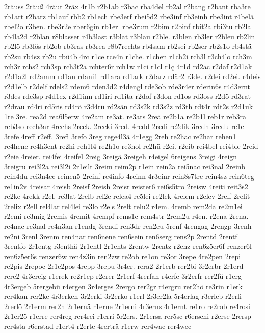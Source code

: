 {2räuss
2räuß
4räut
2räx
4r1b
r2b1ab
r3bac
rba4del
rb2al
r2bang
r2bant
rba3re
rb1art
r2barz
rb1auf
rbb2
rb1ech
rbe3erf
rbei5d2
rbe3inf
rb3einh
rbe3int
r4belä
rbel2o
r3ben.
rbe3r2e
rber6gin
rb1erl
rbe3rum
r2bim
r2binf
rbit2a
rbi3tu
rb2la
rb4la2d
r2blan
r8blasser
r4b3last
r3blat
r3blau
r2ble.
r3blen
rb3ler
r2bleu
rb2lin
rb2lö
rb3lös
rb2ob
rb3ras
rb3rea
r8b7rechts
rb4sam
rb2sei
rb2ser
rb2s1o
rb4stä
rb2su
rb4sz
rb2u
rbü4b
4rc
r1ce
rce4n
r1che.
r1chen
r1ch2i
rch3l
r3ch4lo
rch3m
rch3r
rchs2
rch3sp
rch3t2a
rchter6r
rch1w
r1ci
r1cl
r1ç
4r1d
rd2ac
r2daf
r2d1ak
r2d1a2l
rd2amm
rd1an
rdani1
rd1ara
rd1ark
r2darz
rdär2
r3de.
r2dei
rd2ei.
r4deis
r2d1elb
r2delf
rdels2
rdem6
rden3d2
r4dengl
rde3ob
rde3r4er
rderin6s
r4d3ernt
r3des
rde3sp
r4d1ex
r2d1inn
rd1iri
rd1ita
r2dof
r3don
rd1os
rd3oss
r2dö
rd3rat
r2drau
rd4ri
rd5ris
rd4rö
r3d4rü
rd2sän
rd3s2k
rd3s2z
rd3th
rdt4r
rdt2s
r2d1uk
1re
3re.
rea2d
rea6l5erw
4re2am
re3at.
re3ats
2reä
re2b1a
re2b1l
reb1r
reb3ra
reb3so
rech3ar
4rechs
2reck.
2recki
3red.
4redd
2redi
re2dik
3redn
3redu
re1e
3refe
4reff
r2eff.
3refl
3refo
3reg
rege4l3ä
4r1egg
2reh
re2hac
re2har
rehen1
re4hene
re4h3ent
re2hi
reh1l4
re2h1o
re3hol
re2hü
r2ei.
r2eib
rei4bel
rei4ble
2reid
r2eie
4reier.
rei4fei
4reifel
2reig
3reigä
3reigeh
r4eigel
6reigens
3reigi
4reign
3reigru
rei3l2a
rei3l2i
2r1eilt
3reim
reim2p
r1ein
rein2a
rei5nac
rei3nal
2reinb
rein4du
rei3n4ec
reinen5
2reinf
re4info
4reinn
4r3einr
rein8s7tre
rein4sz
rein6teg
re1in2v
4reisar
4reisb
2reisf
2reish
2reisr
reister6
rei6s5tro
2reisw
4reiti
reit3s2
re2ke
4rekk
r2el.
re3lat
2relb
rel2e
relea4
re5lei
re2lek
4relem
r2elev
2relf
2relit
2relix
r2ell
rel4lar
rel4lei
re3lo
r2els
2relt
relu2
r4em.
4remb
rem2da
re2m1ei
r2emi
re3mig
2remis
4remit
4rempf
rems1c
rem4str
2rem2u
r4en.
r2ena
2rena.
re4nac
re3nal
re4n3an
r1endg
3rendi
ren3dr
ren2eu
5renf
4rengag
2rengp
3renh
re2ni
3renl
3renm
ren4nar
ren6nene
ren6sein
ren6serg
rens2p
2rentd
2rentf
3rentfo
2r1entg
r3enthä
2r1entl
2r1ents
2rentw
2rentz
r2enz
ren6z5er6f
renzer6l
ren6z5er6s
renzer6w
ren4z3in
ren2zw
re2ob
re1on
re3or
3repe
4re2pen
2repi
re2pis
2repoc
2r1e2pos
4repp
3repu
3r4er.
rera2
2r1erb
rer2bi
3r2erbr
2r1erd
rere2
4r3ereig
r1erek
re2r1ep
r2erer
2r1erf
4rerfah
r4erfe
3r2erfr
rer2fü
r1erg
4r3ergeb
5rergebü
r4ergen
3r4erges
2rergo
rer2gr
r4ergru
rer2hö
re3rin
r1erk
rer4kan
rer2ke
4r3erken
3r2erki
3r2erko
r1erl
2r3er2la
5r4erlag
r3erleb
r2erli
2rerlö
2r1erm
rer2n
2r1ernä
r1erne
2r1erni
4r3erns
4r1ernt
re1ro
re2rob
re4rosi
2r1er2ö
r1erre
rer4reg
rer4rei
r1erri
5r2ers.
2r1ersa
rer5sc
r6erschi
r2erse
2rersp
rer4sta
r6erstad
r1ert4
r2erte
4rerträ
r1erw
rer4wac
rer4wec
}
